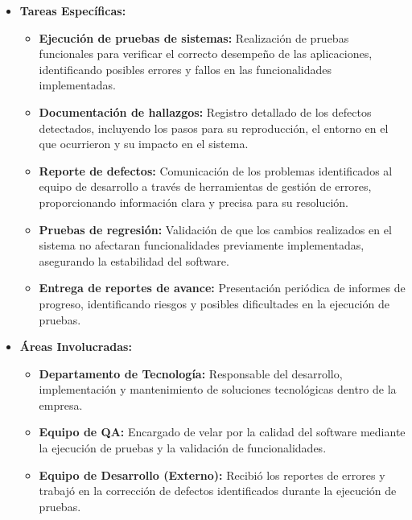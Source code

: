 \documentclass[12pt,a4paper]{report}
\begin{document}
\begin{itemize}
    \item \textbf{Tareas Específicas:}
    \begin{itemize}
        \item \textbf{Ejecución de pruebas de sistemas:} Realización de pruebas funcionales para verificar el correcto desempeño de las aplicaciones, identificando posibles errores y fallos en las funcionalidades implementadas.
        \item \textbf{Documentación de hallazgos:} Registro detallado de los defectos detectados, incluyendo los pasos para su reproducción, el entorno en el que ocurrieron y su impacto en el sistema.
        \item \textbf{Reporte de defectos:} Comunicación de los problemas identificados al equipo de desarrollo a través de herramientas de gestión de errores, proporcionando información clara y precisa para su resolución.
        \item \textbf{Pruebas de regresión:} Validación de que los cambios realizados en el sistema no afectaran funcionalidades previamente implementadas, asegurando la estabilidad del software.
        \item \textbf{Entrega de reportes de avance:} Presentación periódica de informes de progreso, identificando riesgos y posibles dificultades en la ejecución de pruebas.
    \end{itemize}

    \item \textbf{Áreas Involucradas:}
    \begin{itemize}
        \item \textbf{Departamento de Tecnología:} Responsable del desarrollo, implementación y mantenimiento de soluciones tecnológicas dentro de la empresa.
        \item \textbf{Equipo de QA:} Encargado de velar por la calidad del software mediante la ejecución de pruebas y la validación de funcionalidades.
        \item \textbf{Equipo de Desarrollo (Externo):} Recibió los reportes de errores y trabajó en la corrección de defectos identificados durante la ejecución de pruebas.
    \end{itemize}


\end{itemize}
\end{document}
